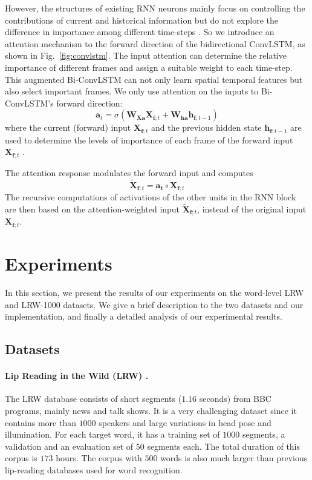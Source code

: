 \documentclass{bmvc2k}
\begin{document}
However, the structures of existing RNN neurons mainly focus on controlling the contributions of current and historical information but do not explore the difference in importance among different time-steps \cite{1zhang2018adding}. So we introduce an attention mechanism to the forward direction of the bidirectional ConvLSTM, as shown in Fig.~\ref{fig:convlstm}. The input attention can determine the relative importance of different frames and assign a suitable weight to each time-step. This augmented Bi-ConvLSTM can not only learn spatial temporal features but also select important frames. We only use attention on the inputs to Bi-ConvLSTM's forward direction:
\begin{equation}
    \mathbf{a}_t=\sigma(\mathbf{W}_{\mathbf{X} \mathbf{a}}\mathbf{X}_{\mathbf{f}; t}+\mathbf{W}_{\mathbf{h a}}\mathbf{h}_{\mathbf{f}; t-1})
\end{equation}
where the current (forward) input $\mathbf{X}_{\mathbf{f}; t}$ and the previous hidden state $\mathbf{h}_{\mathbf{f}; t-1}$ are used to determine the levels of importance of each frame of the forward input  $\mathbf{X}_{\mathbf{f}; t}$ .

The attention response modulates the forward input and computes
\begin{equation}
    \widetilde{\mathbf{X}}_{\mathbf{f}; t}=\mathbf{a _ { t }}\circ \mathbf{X}_{\mathbf{f}; t}
\end{equation}
The recursive computations of activations of the other units in the RNN block are then based on the attention-weighted input $\widetilde{\mathbf{X}}_{\mathbf{f}; t}$, instead of the original input $\mathbf{X}_{\mathbf{f}; t}$.


\section{Experiments}
In this section, we present the results of our experiments on the word-level LRW and LRW-1000 datasets. We give a brief description to the two datasets and our implementation, and finally a detailed analysis of our experimental results.
\vspace{-1em}
\subsection{Datasets}
\paragraph{Lip Reading in the Wild (LRW) \cite{chung2016lip}.}The LRW database consists of short segments ($1.16$ seconds) from BBC programs, mainly news and talk shows. It is a very challenging dataset since it contains more than $1000$ speakers and large variations in head pose and illumination. For each target word, it has a training set of $1000$ segments, a validation and an evaluation set of $50$ segments each. The total duration of this corpus is $173$ hours. The corpus with $500$ words is also much larger than previous lip-reading databases used for word recognition.
\end{document}
